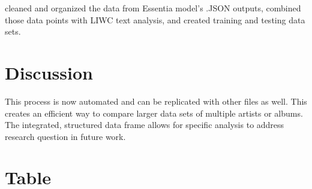 \documentclass{article}\usepackage[]{graphicx}\usepackage[]{xcolor}
\begin{document}
\begin{multicols}{2}
cleaned and organized the data from Essentia model's .JSON outputs, combined those data points with LIWC text analysis, and created training and testing data sets\citep{Bogdanov}. 


\columnbreak
\section{Discussion}
 This process is now automated and can be replicated with other files as well. This creates an efficient way to compare larger data sets of multiple artists or albums. The integrated, structured data frame allows for specific analysis to address research question in future work. 
\end{multicols} %
\section{Table}
\end{document}
